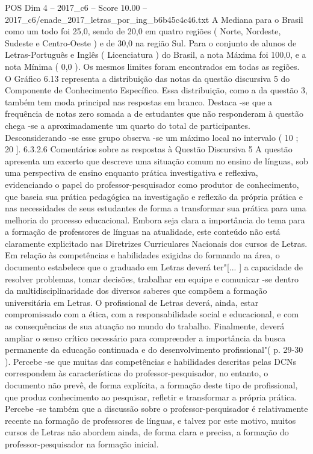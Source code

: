 \begin{textsample}{POS Dim 4 – 2017\_c6 – Score 10.00 – 2017\_c6/enade\_2017\_letras\_por\_ing\_b6b45c4c46.txt}
A Mediana para o Brasil como um todo foi 25,0, sendo de 20,0 em quatro regiões ( Norte, Nordeste, Sudeste e Centro-Oeste ) e de 30,0 na região Sul.
Para o conjunto de alunos de Letras-Português e Inglês ( Licenciatura ) do Brasil, a nota Máxima foi 100,0, e a nota Mínima ( 0,0 ).
Os mesmos limites foram encontrados em todas as regiões.
O Gráfico 6.13 representa a distribuição das notas da questão discursiva 5 do Componente de Conhecimento Específico.
Essa distribuição, como a da questão 3, também tem moda principal nas respostas em branco.
Destaca -se que a frequência de notas zero somada a de estudantes que não responderam à questão chega -se a aproximadamente um quarto do total de participantes.
Desconsiderando -se esse grupo observa -se um máximo local no intervalo ( 10 ; 20 ]. 6.3.2.6 Comentários sobre as respostas à Questão Discursiva 5 A questão apresenta um excerto que descreve uma situação comum no ensino de línguas, sob uma perspectiva de ensino enquanto prática investigativa e reflexiva, evidenciando o papel do professor-pesquisador como produtor de conhecimento, que baseia sua prática pedagógica na investigação e reflexão da própria prática e nas necessidades de seus estudantes de forma a transformar sua prática para uma melhoria do processo educacional.
Embora seja clara a importância do tema para a formação de professores de línguas na atualidade, este conteúdo não está claramente explicitado nas Diretrizes Curriculares Nacionais dos cursos de Letras.
Em relação às competências e habilidades exigidas do formando na área, o documento estabelece que o graduado em Letras deverá ter"[... ] a capacidade de resolver problemas, tomar decisões, trabalhar em equipe e comunicar -se dentro da multidisciplinaridade dos diversos saberes que compõem a formação universitária em Letras.
O profissional de Letras deverá, ainda, estar compromissado com a ética, com a responsabilidade social e educacional, e com as consequências de sua atuação no mundo do trabalho.
Finalmente, deverá ampliar o senso crítico necessário para compreender a importância da busca permanente da educação continuada e do desenvolvimento profissional"( p. 29-30 ).
Percebe -se que muitas das competências e habilidades descritas pelas DCNs correspondem às características do professor-pesquisador, no entanto, o documento não prevê, de forma explícita, a formação deste tipo de profissional, que produz conhecimento ao pesquisar, refletir e transformar a própria prática.
Percebe -se também que a discussão sobre o professor-pesquisador é relativamente recente na formação de professores de línguas, e talvez por este motivo, muitos cursos de Letras não abordem ainda, de forma clara e precisa, a formação do professor-pesquisador na formação inicial.

\end{textsample}
